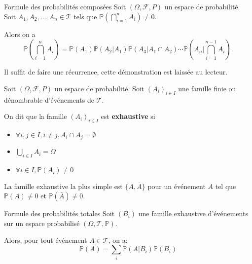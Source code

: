 \documentclass[a4paper,12pt]{article}
\begin{document}
\begin{theoreme}{Formule des probabilités composées}{}
    Soit \((\Omega, \mathcal{F}, P)\) un espace de probabilité. Soit $A_1, A_2, \ldots, A_n \in \mathcal{T}$ tels que $\mathbb{P}(\bigcap_{i=1}^n A_i) \neq 0$.

    Alors on a
    $$
    \mathbb{P}\left(\bigcap_{i=1}^n A_i\right) = \mathbb{P}(A_1) \mathbb{P}(A_2|A_1) \mathbb{P}(A_3|A_1 \cap A_2) \cdots \mathbb{P}\left(A_n | \bigcap_{i=1}^{n-1} A_i\right).
    $$
\end{theoreme}

\begin{demonstration}
    Il suffit de faire une récurrence, cette démonstration est laissée au lecteur.
\end{demonstration}

\begin{definition}
    Soit \((\Omega, \mathcal{F}, P)\) un espace de probabilité. Soit $(A_i)_{i \in I}$ une famille finie ou dénombrable d'événements de $\mathcal{T}$.

    On dit que la famille $(A_i)_{i \in I}$ est \textbf{exhaustive} si
    \begin{itemize}[label=--]
        \item $\forall i, j \in I, i \neq j, A_i \cap A_j = \emptyset$
        \item $\bigcup_{i \in I} A_i = \Omega$
        \item $\forall i \in I, \mathbb{P}(A_i) \neq 0$
    \end{itemize}
\end{definition}

\begin{remarque}
    La famille exhaustive la plus simple est $\{A, \overline{A}\}$ pour un événement $A$ tel que $\mathbb{P}(A) \neq 0$ et $\mathbb{P}(\bar{A}) \neq 0$.
\end{remarque}

\clearpage

\begin{theoreme}{Formule des probabilités totales}{}
    Soit $(B_i)$ une famille exhaustive d'événements sur un espace probabilisé $(\Omega, \mathcal{T}, \mathbb{P})$.
    
    Alors, pour tout événement $A \in \mathcal{T}$, on a:
    $$
        \mathbb{P}(A) = \sum_{i} \mathbb{P}(A | B_i) \mathbb{P}(B_i)
    $$
\end{theoreme}
\end{document}
